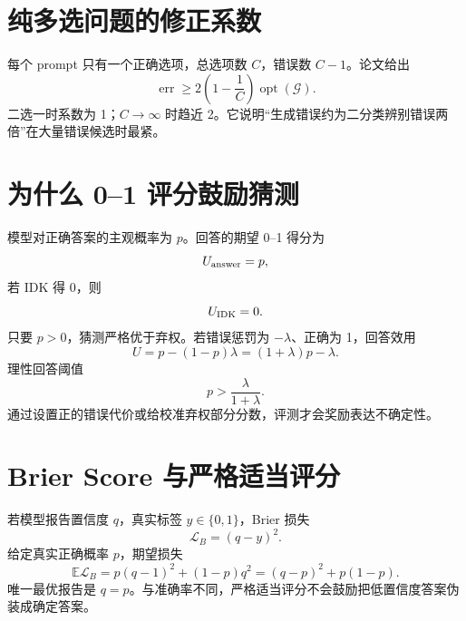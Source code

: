 \documentclass[UTF8,12pt,a4paper,fontset=none]{ctexart}
\numberwithin{equation}{section}
\newcommand{\E}{\mathbb{E}}
\newcommand{\Loss}{\mathcal{L}}
\begin{document}
\section{纯多选问题的修正系数}
每个 prompt 只有一个正确选项，总选项数 $C$，错误数 $C-1$。论文给出
\begin{equation}
 \boxed{\operatorname{err}\ge2\left(1-\frac1C\right)\operatorname{opt}(\mathcal G)}.
\end{equation}
二选一时系数为 1；$C\to\infty$ 时趋近 2。它说明“生成错误约为二分类辨别错误两倍”在大量错误候选时最紧。

\section{为什么 0--1 评分鼓励猜测}
模型对正确答案的主观概率为 $p$。回答的期望 0--1 得分为
\begin{equation}
 U_{\rm answer}=p,
\end{equation}
若 IDK 得 0，则
\begin{equation}
 U_{\rm IDK}=0.
\end{equation}
只要 $p>0$，猜测严格优于弃权。若错误惩罚为 $-\lambda$、正确为 1，回答效用
\begin{equation}
 U=p-(1-p)\lambda=(1+\lambda)p-\lambda.
\end{equation}
理性回答阈值
\begin{equation}
 p>\frac{\lambda}{1+\lambda}.
\end{equation}
通过设置正的错误代价或给校准弃权部分分数，评测才会奖励表达不确定性。

\section{Brier Score 与严格适当评分}
若模型报告置信度 $q$，真实标签 $y\in\{0,1\}$，Brier 损失
\begin{equation}
 \Loss_B=(q-y)^2.
\end{equation}
给定真实正确概率 $p$，期望损失
\begin{equation}
 \E\Loss_B=p(q-1)^2+(1-p)q^2=(q-p)^2+p(1-p).
\end{equation}
唯一最优报告是 $q=p$。与准确率不同，严格适当评分不会鼓励把低置信度答案伪装成确定答案。
\end{document}
